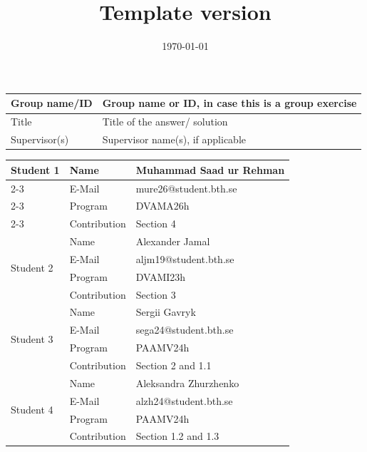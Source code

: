 \documentclass[12pt,a4paper]{article}
\title{\theAssignment\\\vspace{1mm}\footnotesize{Template version \templateVersion}}
\author{\textsc{\theCourse}}
\date{\today}
\begin{document}
%
\maketitle
%
\vspace*{-12mm}

\begin{longtable}{|l|p{12.15cm}|}
\hline
Group name/ID & Group name or ID, in case this is a group exercise \\ 
\hline
Title         & Title of the answer/ solution \\
\hline
Supervisor(s) & Supervisor name(s), if applicable \\
\hline
\end{longtable}


\vspace*{-7mm}
\begin{small}
\begin{longtable}{|l|l|p{10.9cm}|}
\hline
\multirow{4}{*}{Student 1}
 & Name           & Muhammad Saad ur Rehman \\ \cline{2-3}
 & E-Mail         & mure26@student.bth.se \\ \cline{2-3}
 & Program        & DVAMA26h \\ \cline{2-3}
 & Contribution   & Section 4 \\
\hline
\multirow{4}{*}{Student 2}
 & Name           &  Alexander Jamal \\ \cline{2-3}
 & E-Mail         &  aljm19@student.bth.se \\ \cline{2-3}
 & Program        &  DVAMI23h \\ \cline{2-3}
 & Contribution   &  Section 3\\
\hline
\multirow{4}{*}{Student 3}
 & Name           &  Sergii Gavryk \\ \cline{2-3}
 & E-Mail         &  sega24@student.bth.se \\ \cline{2-3}
 & Program        &  PAAMV24h \\ \cline{2-3}
 & Contribution   &  Section 2 and 1.1\\
\hline
\multirow{4}{*}{Student 4}
 & Name           &  Aleksandra Zhurzhenko \\ \cline{2-3}
 & E-Mail         &  alzh24@student.bth.se \\ \cline{2-3}
 & Program        &  PAAMV24h \\ \cline{2-3}
 & Contribution   &  Section 1.2 and 1.3\\
\hline

\end{longtable}
\end{small}
\end{document}

